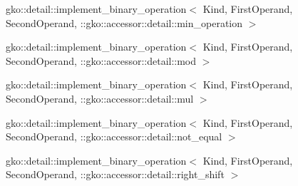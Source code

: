 \begin{DoxyCompactList}
\begin{DoxyCompactList}
\item {}
\end{DoxyCompactList}
\item gko\+:\+:detail\+:\+:implement\+\_\+binary\+\_\+operation$<$ Kind, First\+Operand, Second\+Operand, \+:\+:gko\+:\+:accessor\+:\+:detail\+:\+:min\+\_\+operation $>$\begin{DoxyCompactList}
\item {}
\end{DoxyCompactList}
\item gko\+:\+:detail\+:\+:implement\+\_\+binary\+\_\+operation$<$ Kind, First\+Operand, Second\+Operand, \+:\+:gko\+:\+:accessor\+:\+:detail\+:\+:mod $>$\begin{DoxyCompactList}
\item {}
\end{DoxyCompactList}
\item gko\+:\+:detail\+:\+:implement\+\_\+binary\+\_\+operation$<$ Kind, First\+Operand, Second\+Operand, \+:\+:gko\+:\+:accessor\+:\+:detail\+:\+:mul $>$\begin{DoxyCompactList}
\item {}
\end{DoxyCompactList}
\item gko\+:\+:detail\+:\+:implement\+\_\+binary\+\_\+operation$<$ Kind, First\+Operand, Second\+Operand, \+:\+:gko\+:\+:accessor\+:\+:detail\+:\+:not\+\_\+equal $>$\begin{DoxyCompactList}
\item {}
\end{DoxyCompactList}
\item gko\+:\+:detail\+:\+:implement\+\_\+binary\+\_\+operation$<$ Kind, First\+Operand, Second\+Operand, \+:\+:gko\+:\+:accessor\+:\+:detail\+:\+:right\+\_\+shift $>$\begin{DoxyCompactList}

\end{DoxyCompactList}
\end{DoxyCompactList}
